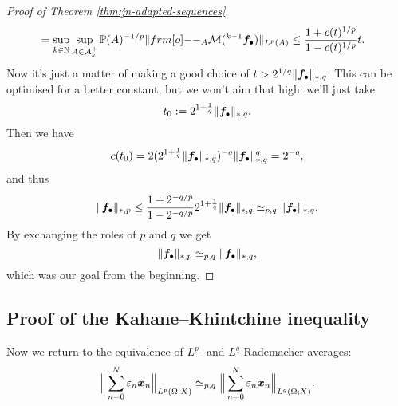 \begin{proof}[Proof of Theorem \ref{thm:jn-adapted-sequences}]
\begin{equation*}
\begin{aligned}
      &= \sup_{k \in \N} \sup_{A \in \mc{A}_{k}^{+}} \P(A)^{-1/p} \|\1_{A} \mc{M}({}^{k-1}\mb{f}_{\bullet}) \|_{L^p(A)} 
      \leq \frac{1 + c(t)^{1/p}}{1 - c(t)^{1/p}} t .
    \end{aligned}
  \end{equation*}
  Now it's just a matter of making a good choice of $t > 2^{1/q} \|\bm{f}_{\bullet}\|_{*,q}$.
  This can be optimised for a better constant, but we won't aim that high: we'll just take
  \begin{equation*}
    t_{0} := 2^{1 + \frac{1}{q}} \|\bm{f}_{\bullet}\|_{*,q}.
  \end{equation*}
  Then we have
  \begin{equation*}
    c(t_0) = 2(2^{1 + \frac{1}{q}} \|\bm{f}_{\bullet}\|_{*,q})^{-q} \|\bm{f}_{\bullet}\|_{*,q}^{q} = 2^{-q},
  \end{equation*}
  and thus
  \begin{equation*}
    \|\bm{f}_{\bullet}\|_{*,p} \leq \frac{1 + 2^{-q/p}}{1 - 2^{-q/p}} 2^{1 + \frac{1}{q}} \|\bm{f}_{\bullet}\|_{*,q} \simeq_{p,q} \|\bm{f}_{\bullet}\|_{*,q}.
  \end{equation*}
  By exchanging the roles of $p$ and $q$ we get
  \begin{equation*}
    \|\bm{f}_{\bullet}\|_{*,p} \simeq_{p,q} \|\bm{f}_{\bullet}\|_{*,q},
  \end{equation*}
  which was our goal from the beginning.
  
\end{proof}

\subsection{Proof of the Kahane--Khintchine inequality}

Now we return to the equivalence of $L^p$- and $L^q$-Rademacher averages:
\begin{equation*}
  \Big\|\sum_{n=0}^{N} \varepsilon_{n} \bm{x}_{n} \Big\|_{L^p(\Omega;X)} \simeq_{p,q} \Big\|\sum_{n=0}^{N} \varepsilon_{n} \bm{x}_{n} \Big\|_{L^q(\Omega;X)}.
\end{equation*}

